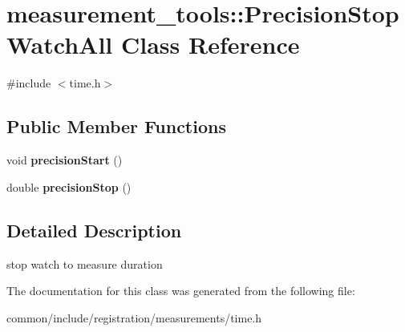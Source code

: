 \hypertarget{classmeasurement__tools_1_1PrecisionStopWatchAll}{
\section{measurement\_\-tools::PrecisionStopWatchAll Class Reference}
\label{classmeasurement__tools_1_1PrecisionStopWatchAll}
}


{\ttfamily \#include $<$time.h$>$}

\subsection*{Public Member Functions}
\begin{DoxyCompactItemize}
\item 
\hypertarget{classmeasurement__tools_1_1PrecisionStopWatchAll_adb5a8726007a23ba538e658c7f780ff6}{
void {\bfseries precisionStart} ()}
\label{classmeasurement__tools_1_1PrecisionStopWatchAll_adb5a8726007a23ba538e658c7f780ff6}

\item 
\hypertarget{classmeasurement__tools_1_1PrecisionStopWatchAll_aa413d864d8066718674424296ccb56ad}{
double {\bfseries precisionStop} ()}
\label{classmeasurement__tools_1_1PrecisionStopWatchAll_aa413d864d8066718674424296ccb56ad}

\end{DoxyCompactItemize}


\subsection{Detailed Description}
stop watch to measure duration 

The documentation for this class was generated from the following file:\begin{DoxyCompactItemize}
\item 
common/include/registration/measurements/time.h\end{DoxyCompactItemize}

